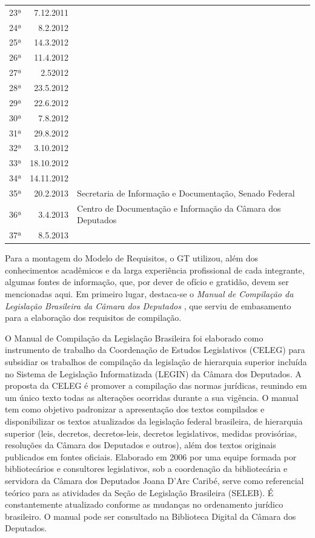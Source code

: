 \documentclass[a4paper,11pt,openright,twoside,brazil]{abntex2}
\begin{document}
\begin{table}[htb]
\begin{tabular}{c|r|p{10.0cm}}
    23ª & 7.12.2011
    \\ \cline{1-2}
    24ª & 8.2.2012
    \\ \cline{1-2}
    25ª & 14.3.2012
    \\ \cline{1-2}
    26ª & 11.4.2012
    \\ \cline{1-2}
    27ª & 2.52012
    \\ \cline{1-2}
    28ª & 23.5.2012
    \\ \cline{1-2}
    29ª & 22.6.2012
    \\ \cline{1-2}
    30ª & 7.8.2012
    \\ \cline{1-2}
    31ª & 29.8.2012
    \\ \cline{1-2}
    32ª & 3.10.2012
    \\ \cline{1-2}
    33ª & 18.10.2012
    \\ \cline{1-2}
    34ª & 14.11.2012
    \\ \hline
    35ª & 20.2.2013 & Secretaria de Informação e Documentação, Senado Federal
    \\ \hline
    36ª & 3.4.2013 & \multirow{1}{*}{Centro de Documentação e Informação da
    Câmara dos Deputados}
    \\ \cline{1-2}
    37ª & 8.5.2013
    \\ \hline
    \hline
\end{tabular}
\end{table}

Para a montagem do Modelo de Requisitos, o GT utilizou, além dos conhecimentos
acadêmicos e da larga experiência profissional de cada integrante, algumas
fontes de informação, que, por dever de ofício e gratidão, devem ser mencionadas
aqui. Em primeiro lugar, destaca-se o \emph{Manual de Compilação da Legislação
Brasileira da Câmara dos Deputados} \cite{cd2012}, que serviu de embasamento
para a elaboração dos requisitos de compilação.

O Manual de Compilação da Legislação Brasileira foi elaborado como instrumento
de trabalho da Coordenação de Estudos Legislativos (CELEG) para subsidiar os
trabalhos de compilação da legislação de hierarquia superior incluída no Sistema
de Legislação Informatizada (LEGIN) da Câmara dos Deputados. A proposta da CELEG
é promover a compilação das normas jurídicas, reunindo em um único texto todas
as alterações ocorridas durante a sua vigência. O manual tem como objetivo
padronizar a apresentação dos textos compilados e disponibilizar os textos
atualizados da legislação federal brasileira, de hierarquia superior (leis,
decretos, decretos-leis, decretos legislativos, medidas provisórias, resoluções
da Câmara dos Deputados e outros), além dos textos originais publicados em
fontes oficiais. Elaborado em 2006 por uma equipe formada por bibliotecários e
consultores legislativos, sob a coordenação da bibliotecária e servidora da
Câmara dos Deputados Joana D’Arc Caribé, serve como referencial teórico para as
atividades da Seção de Legislação Brasileira (SELEB). É constantemente
atualizado conforme as mudanças no ordenamento jurídico brasileiro. O manual
pode ser consultado na Biblioteca Digital da Câmara dos Deputados.
\end{document}
